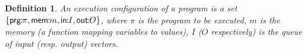 \documentclass[10pt,a4paper,oneside]{article}
\newtheorem{definition}{Definition}[section]
\def\substitute#1#2#3{\ensuremath{#1[#2\mapsto#3]}}
\def\VTRUE{\ensuremath{\textbf{T}}}
\def\VFALSE{\ensuremath{\textbf{F}}}
\def\NIL{\ensuremath{\bot}}
\def\ACCORCIA{\vspace*{-\baselineskip}}
\def\lpair#1#2{#1\!\!:\!\!\ensuremath{#2}}
\def\lcomma{\ensuremath{\!\!:\!\!}}
\def\valueM{\ensuremath{val}}
\def\comm{\ensuremath{\pi}}
\def\LabelRule#1#2#3{\ensuremath{{\inferrule*[Left={#1}]{#2}{#3}}}}
\def\ruleconl#1#2{\ensuremath{\Delta, #1  \rightarrowtriangle \Delta, #2}}
\def\RASSG{ASSG}
\def\RCOMP{COMP}
\def\RIFT{IF-T}
\def\RIFF{IF-F}
\def\RWHILET{WHIL-T}
\def\RWHILEF{WHIL-F}
\def\RSKIP{SKIP}
\def\RINPUT{INP}
\def\lprog{{\sf prg}}
\def\lmem{{\sf mem}}
\def\linput{{\sf in}}
\def\loutput{{\sf out}}
\begin{document}
\begin{definition}\label{def:execConf}
An \emph{execution configuration} of a program is a set $\{\lpair{\lprog}{\comm}, \lpair{\lmem}{m}, \lpair{\linput}{I}, \lpair{\loutput}{O} \}$, where $\comm$ is the program to be executed,  $m$ is the memory (a function mapping variables to values), $I$ ($O$ respectively) is the queue of input (resp. output) vectors.
\end{definition}

\begin{figure}[!t]
\begin{center}
\ACCORCIA
{}
\end{center}
\end{figure}
\end{document}
